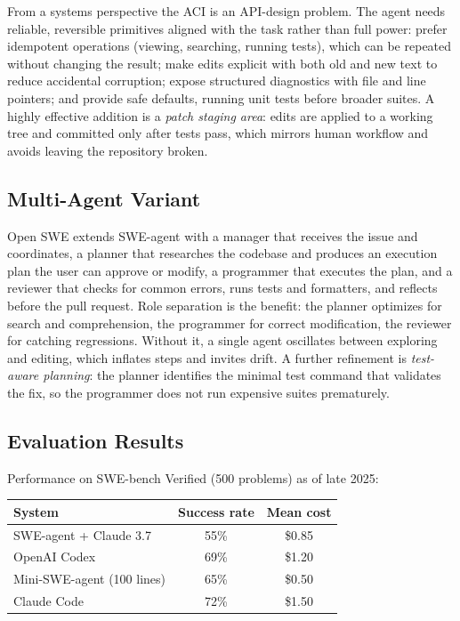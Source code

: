 \documentclass[11pt]{book}
\begin{document}
From a systems perspective the ACI is an API-design problem. The agent needs reliable, reversible primitives aligned with the task rather than full power: prefer idempotent operations (viewing, searching, running tests), which can be repeated without changing the result; make edits explicit with both old and new text to reduce accidental corruption; expose structured diagnostics with file and line pointers; and provide safe defaults, running unit tests before broader suites. A highly effective addition is a \textit{patch staging area}: edits are applied to a working tree and committed only after tests pass, which mirrors human workflow and avoids leaving the repository broken.

\subsection{Multi-Agent Variant}

Open SWE \cite{openswe2025} extends SWE-agent with a manager that receives the issue and coordinates, a planner that researches the codebase and produces an execution plan the user can approve or modify, a programmer that executes the plan, and a reviewer that checks for common errors, runs tests and formatters, and reflects before the pull request. Role separation is the benefit: the planner optimizes for search and comprehension, the programmer for correct modification, the reviewer for catching regressions. Without it, a single agent oscillates between exploring and editing, which inflates steps and invites drift. A further refinement is \textit{test-aware planning}: the planner identifies the minimal test command that validates the fix, so the programmer does not run expensive suites prematurely.

\subsection{Evaluation Results}

Performance on SWE-bench Verified (500 problems) as of late 2025:

\begin{center}
\begin{tabular}{lcc}
\toprule
System & Success rate & Mean cost \\
\midrule
SWE-agent + Claude 3.7 & 55\% & \$0.85 \\
OpenAI Codex & 69\% & \$1.20 \\
Mini-SWE-agent (100 lines) & 65\% & \$0.50 \\
Claude Code & 72\% & \$1.50 \\
\bottomrule
\end{tabular}
\end{center}
\end{document}
